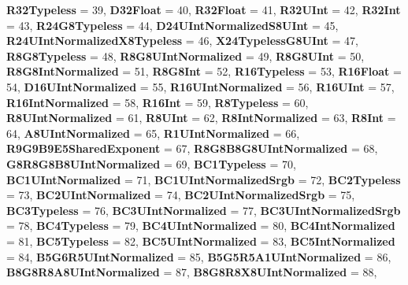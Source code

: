 \begin{DoxyCompactItemize}
{\bfseries R32\+Typeless} = 39, 
{\bfseries D32\+Float} = 40, 
{\bfseries R32\+Float} = 41, 
{\bfseries R32\+U\+Int} = 42, 
\newline
{\bfseries R32\+Int} = 43, 
{\bfseries R24\+G8\+Typeless} = 44, 
{\bfseries D24\+U\+Int\+Normalized\+S8\+U\+Int} = 45, 
{\bfseries R24\+U\+Int\+Normalized\+X8\+Typeless} = 46, 
\newline
{\bfseries X24\+Typeless\+G8\+U\+Int} = 47, 
{\bfseries R8\+G8\+Typeless} = 48, 
{\bfseries R8\+G8\+U\+Int\+Normalized} = 49, 
{\bfseries R8\+G8\+U\+Int} = 50, 
\newline
{\bfseries R8\+G8\+Int\+Normalized} = 51, 
{\bfseries R8\+G8\+Int} = 52, 
{\bfseries R16\+Typeless} = 53, 
{\bfseries R16\+Float} = 54, 
\newline
{\bfseries D16\+U\+Int\+Normalized} = 55, 
{\bfseries R16\+U\+Int\+Normalized} = 56, 
{\bfseries R16\+U\+Int} = 57, 
{\bfseries R16\+Int\+Normalized} = 58, 
\newline
{\bfseries R16\+Int} = 59, 
{\bfseries R8\+Typeless} = 60, 
{\bfseries R8\+U\+Int\+Normalized} = 61, 
{\bfseries R8\+U\+Int} = 62, 
\newline
{\bfseries R8\+Int\+Normalized} = 63, 
{\bfseries R8\+Int} = 64, 
{\bfseries A8\+U\+Int\+Normalized} = 65, 
{\bfseries R1\+U\+Int\+Normalized} = 66, 
\newline
{\bfseries R9\+G9\+B9\+E5\+Shared\+Exponent} = 67, 
{\bfseries R8\+G8\+B8\+G8\+U\+Int\+Normalized} = 68, 
{\bfseries G8\+R8\+G8\+B8\+U\+Int\+Normalized} = 69, 
{\bfseries B\+C1\+Typeless} = 70, 
\newline
{\bfseries B\+C1\+U\+Int\+Normalized} = 71, 
{\bfseries B\+C1\+U\+Int\+Normalized\+Srgb} = 72, 
{\bfseries B\+C2\+Typeless} = 73, 
{\bfseries B\+C2\+U\+Int\+Normalized} = 74, 
\newline
{\bfseries B\+C2\+U\+Int\+Normalized\+Srgb} = 75, 
{\bfseries B\+C3\+Typeless} = 76, 
{\bfseries B\+C3\+U\+Int\+Normalized} = 77, 
{\bfseries B\+C3\+U\+Int\+Normalized\+Srgb} = 78, 
\newline
{\bfseries B\+C4\+Typeless} = 79, 
{\bfseries B\+C4\+U\+Int\+Normalized} = 80, 
{\bfseries B\+C4\+Int\+Normalized} = 81, 
{\bfseries B\+C5\+Typeless} = 82, 
\newline
{\bfseries B\+C5\+U\+Int\+Normalized} = 83, 
{\bfseries B\+C5\+Int\+Normalized} = 84, 
{\bfseries B5\+G6\+R5\+U\+Int\+Normalized} = 85, 
{\bfseries B5\+G5\+R5\+A1\+U\+Int\+Normalized} = 86, 
\newline
{\bfseries B8\+G8\+R8\+A8\+U\+Int\+Normalized} = 87, 
{\bfseries B8\+G8\+R8\+X8\+U\+Int\+Normalized} = 88, 

\end{DoxyCompactItemize}
